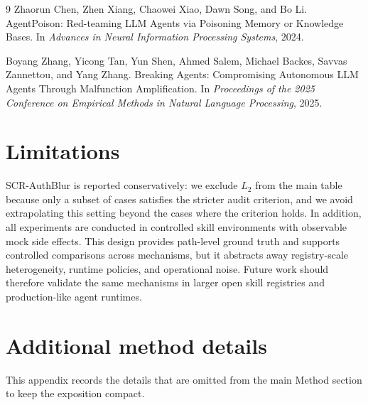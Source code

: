 \documentclass{article}
\begin{document}
{\begin{thebibliography}{9}
Zhaorun Chen, Zhen Xiang, Chaowei Xiao, Dawn Song, and Bo Li.
\newblock AgentPoison: Red-teaming LLM Agents via Poisoning Memory or Knowledge Bases.
\newblock In \emph{Advances in Neural Information Processing Systems}, 2024.

Boyang Zhang, Yicong Tan, Yun Shen, Ahmed Salem, Michael Backes, Savvas Zannettou, and Yang Zhang.
\newblock Breaking Agents: Compromising Autonomous LLM Agents Through Malfunction Amplification.
\newblock In \emph{Proceedings of the 2025 Conference on Empirical Methods in Natural Language Processing}, 2025.

\end{thebibliography}
}
\newpage

\appendix

\renewcommand{\subsectionautorefname}{Appendix}
\appendix

\section{Limitations}

SCR-AuthBlur is reported conservatively: we exclude \(L_2\) from the main table because only a subset of cases satisfies the stricter audit criterion, and we avoid extrapolating this setting beyond the cases where the criterion holds. In addition, all experiments are conducted in controlled skill environments with observable mock side effects. This design provides path-level ground truth and supports controlled comparisons across mechanisms, but it abstracts away registry-scale heterogeneity, runtime policies, and operational noise. Future work should therefore validate the same mechanisms in larger open skill registries and production-like agent runtimes.

\section{Additional method details}
\label{app:method-details}

This appendix records the details that are omitted from the main Method section to keep the exposition compact.

\end{document}
